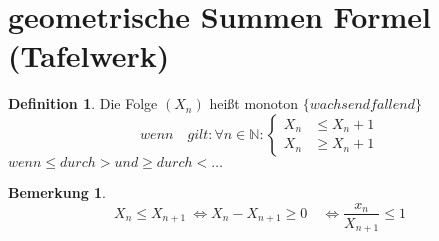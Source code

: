 \documentclass[a4paper,12pt,leqno]{report}
\theoremstyle{plain} %
\theoremstyle{definition} %
\newtheorem{remark}[theorem]{Bemerkung}
\newtheorem{definition}[theorem]{Definition}
\begin{document}
\section{geometrische Summen Formel (Tafelwerk)}
\begin{definition}
	
	Die Folge $(X_n)$ heißt monoton $\Big\{ wachsend fallend \Big\}$
	\[ wenn \quad gilt: \forall n \in \mathbb{N}:
	\left\{
	\begin{array}{ll}
	X_n  & \leq X_n +1 \\
	X_n  & \geq X_n+1
	\end{array}
	\right. \]
	$ wenn \leq durch > und \geq durch < \dots  $
\end{definition}
\begin{remark}
\[ X_n \leq X_{n+1} \ \Leftrightarrow  X_n - X_{n+1} \geq 0 \quad \Leftrightarrow  \frac{x_n}{X_{n+1}} \leq 1 \]
\end{remark}
\end{document}
